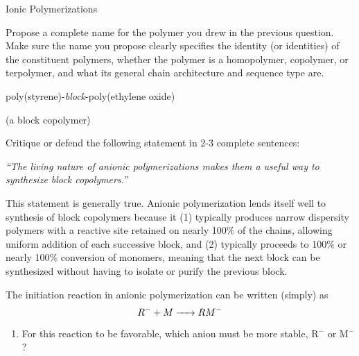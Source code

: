 \begin{activity}{Ionic Polymerizations}
\begin{ctqs}
	\question Propose a complete name for the polymer you drew in the previous question.  Make sure the name you propose clearly specifies the identity (or identities) of the constituent polymers, whether the polymer is a homopolymer, copolymer, or terpolymer, and what its general chain architecture and sequence type are. 
	
		\begin{solution}[1in]
			poly(styrene)-\emph{block}-poly(ethylene oxide)
			
			(a block copolymer)
		\end{solution}
		
	\question Critique or defend the following statement in 2-3 complete sentences:
	
		\emph{``The living nature of anionic polymerizations makes them a useful way to synthesize block copolymers.''}
		
		\begin{solution}[1.5in]
			This statement is generally true.  Anionic polymerization lends itself well to synthesis of block copolymers because it (1) typically produces narrow dispersity polymers with a reactive site retained on nearly 100\% of the chains, allowing uniform addition of each successive block, and (2) typically proceeds to 100\% or nearly 100\% conversion of monomers, meaning that the next block can be synthesized without having to isolate or purify the previous block.
		\end{solution}
	
\end{ctqs}


\begin{exercises}


	\exercise The initiation reaction in anionic polymerization can be written (simply) as %
		\begin{equation*}
			R^- + M \ce{->} RM^-
		\end{equation*}
		
		\begin{enumerate}
			\item For this reaction to be favorable, which anion must be more stable, R$^-$ or M$^-$?
			
				\begin{solution}\end{solution}
				

\end{enumerate}
\end{exercises}
\end{activity}
